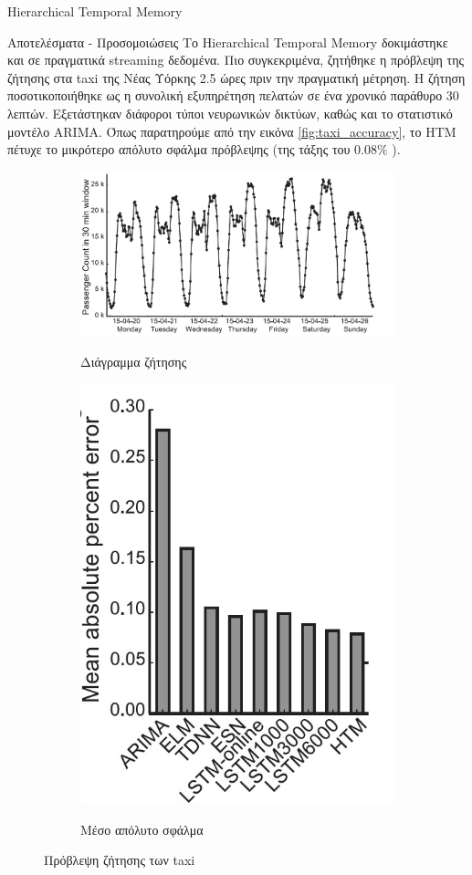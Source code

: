 \documentclass[a4paper,11pt]{article}
\begin{document}
\begin{section}{Hierarchical Temporal Memory}
\begin{subsection}{Αποτελέσματα - Προσομοιώσεις}
    Το Hierarchical Temporal Memory δοκιμάστηκε και σε πραγματικά streaming δεδομένα. Πιο συγκεκριμένα, ζητήθηκε η πρόβλεψη της ζήτησης στα taxi της Νέας Υόρκης 2.5 ώρες πριν την πραγματική μέτρηση. Η ζήτηση ποσοτικοποιήθηκε ως η συνολική εξυπηρέτηση πελατών σε ένα χρονικό παράθυρο 30 λεπτών. Εξετάστηκαν διάφοροι τύποι νευρωνικών δικτύων, καθώς και το στατιστικό μοντέλο ARIMA. Όπως παρατηρούμε από την εικόνα \eqref{fig:taxi_accuracy}, το HTM πέτυχε το μικρότερο απόλυτο σφάλμα πρόβλεψης (της τάξης του $0.08\%$ ).\\
    \begin{figure} [H]
      \centering%
      \begin{subfigure}{0.5\columnwidth}
        {\includegraphics[width=\columnwidth,clip=true]{pics/taxi_demand.jpg}}
        \caption{Διάγραμμα ζήτησης}\label{fig:taxi_demand}
      \end{subfigure}%
      \begin{subfigure}{0.5\columnwidth}
        \centering
        {\includegraphics[width=0.5\columnwidth,clip=true]{pics/taxi_accuracy.jpg}}
        \caption{Μέσο απόλυτο σφάλμα}\label{fig:taxi_accuracy}
      \end{subfigure} \label{fig:taxi_simulation}
      \caption{Πρόβλεψη ζήτησης των taxi}
    \end{figure}


\end{subsection}
\end{section}
\end{document}
